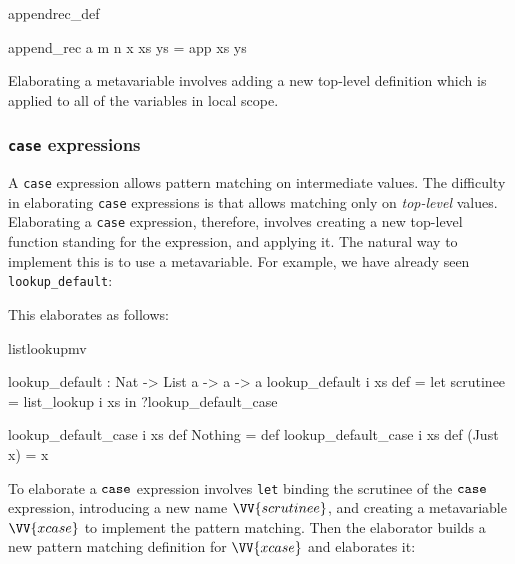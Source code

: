 \begin{SaveVerbatim}{appendrec_def}

append_rec a m n x xs ys = app xs ys

\end{SaveVerbatim}

Elaborating a metavariable involves adding a new top-level definition which is applied
to all of the variables in local scope.


\subsubsection{\texttt{case} expressions}

A \texttt{case} expression allows pattern matching on intermediate values. The difficulty
in elaborating \texttt{case} expressions is that \TT{} allows matching only on
\emph{top-level} values. Elaborating a \texttt{case} expression, therefore,
involves creating a new top-level function standing for the expression, and applying it. 
The natural
way to implement this is to use a metavariable. For example, we have already seen
\texttt{lookup\_default}:


\noindent
This elaborates as follows:

\begin{SaveVerbatim}{listlookupmv}

lookup_default : Nat -> List a -> a -> a
lookup_default i xs def = 
   let scrutinee = list_lookup i xs in ?lookup_default_case

lookup_default_case i xs def Nothing  = def
lookup_default_case i xs def (Just x) = x

\end{SaveVerbatim}

To elaborate a $\mathtt{case}$ expression involves \texttt{let} binding the scrutinee
of the $\mathtt{case}$ expression, introducing a new name $\VV{scrutinee}$, and
creating a metavariable $\VV{xcase}$ to implement the pattern matching. Then
the elaborator builds a new pattern matching definition for $\VV{xcase}$ and
elaborates it:


